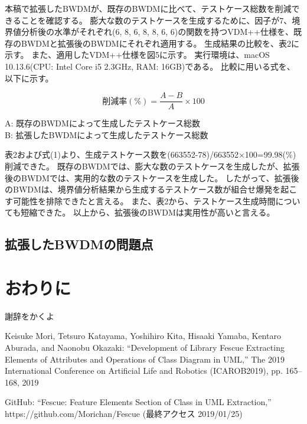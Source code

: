 \documentclass[uplatex, report, a4j, 10pt]{jsbook}
\newcommand{\tool}{BWDM}
\begin{document}
本稿で拡張したBWDMが、既存のBWDMに比べて、テストケース総数を削減できることを確認する。
膨大な数のテストケースを生成するために、因子が7、境界値分析後の水準がそれぞれ(6, 8, 6, 8, 8, 6, 6)の関数を持つVDM++仕様を、既存のBWDMと拡張後のBWDMにそれぞれ適用する。
生成結果の比較を、表2に示す。
また、適用したVDM++仕様を図5に示す。
実行環境は、macOS 10.13.6(CPU: Intel Core i5 2.3GHz, RAM: 16GB)である。
比較に用いる式を、以下に示す。

\begin{equation}
  削減率(\%) = \frac{A - B}{A} \times 100
\end{equation}

\begin{center}
  A: 既存のBWDMによって生成したテストケース総数\\
  B: 拡張したBWDMによって生成したテストケース総数\\
\end{center}

表2および式(1)より、生成テストケース数を(663552-78)/663552×100=99.98(\%)削減できた。
既存のBWDMでは、膨大な数のテストケースを生成したが、拡張後のBWDMでは、実用的な数のテストケースを生成した。
したがって、拡張後のBWDMは、境界値分析結果から生成するテストケース数が組合せ爆発を起こす可能性を排除できたと言える。
また、表2から、テストケース生成時間についても短縮できた。
以上から、拡張後のBWDMは実用性が高いと言える。

\section{拡張した\tool{}の問題点}

\chapter{おわりに} \label{cha:Conclusion}

%
\acknowledgment{}

謝辞をかくよ


%
\begin{thebibliography}{99}
   Keisuke Mori, Tetsuro Katayama, Yoshihiro Kita, Hisaaki Yamaba, Kentaro Aburada, and Naonobu Okazaki: ``Development of Library Fescue Extracting Elements of Attributes and Operations of Class Diagram in UML,'' The 2019 International Conference on Artificial Life and Robotics (ICAROB2019), pp. 165--168, 2019

   GitHub: ``Fescue: Feature Elements Section of Class in UML Extraction,'' https://github.com/Morichan/Fescue (最終アクセス 2019/01/25)
\end{thebibliography}

%
\end{document}
